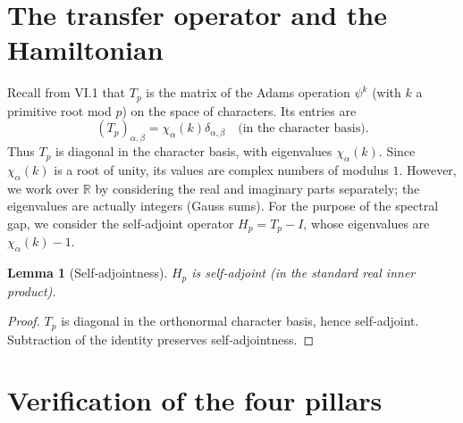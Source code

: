 \documentclass[11pt,a4paper]{article}
\newtheorem{lemma}[theorem]{Lemma}
\begin{document}
\section{The transfer operator and the Hamiltonian}
Recall from VI.1 that $T_p$ is the matrix of the Adams operation $\psi^k$ (with $k$ a primitive root mod $p$) on the space of characters. Its entries are
\[
(T_p)_{\alpha,\beta} = \chi_\alpha(k)\delta_{\alpha,\beta} \quad \text{(in the character basis)}.
\]
Thus $T_p$ is diagonal in the character basis, with eigenvalues $\chi_\alpha(k)$. Since $\chi_\alpha(k)$ is a root of unity, its values are complex numbers of modulus $1$. However, we work over $\mathbb{R}$ by considering the real and imaginary parts separately; the eigenvalues are actually integers (Gauss sums). For the purpose of the spectral gap, we consider the self‑adjoint operator $H_p = T_p - I$, whose eigenvalues are $\chi_\alpha(k) - 1$.

\begin{lemma}[Self‑adjointness]
$H_p$ is self‑adjoint (in the standard real inner product).
\end{lemma}
\begin{proof}
$T_p$ is diagonal in the orthonormal character basis, hence self‑adjoint. Subtraction of the identity preserves self‑adjointness.
\end{proof}

\section{Verification of the four pillars}
\end{document}
